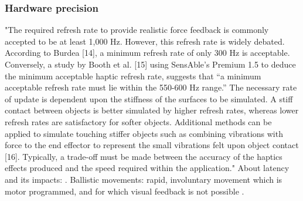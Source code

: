 \subsubsection{Hardware precision}
"The required refresh rate to provide realistic
force feedback is commonly accepted to be at least 1,000 Hz.
However, this refresh rate is widely debated. According to
Burdea [14], a minimum refresh rate of only 300 Hz is
acceptable. Conversely, a study by Booth et al. [15] using
SensAble’s Premium 1.5 to deduce the minimum acceptable
haptic refresh rate, suggests that “a minimum acceptable
refresh rate must lie within the 550-600 Hz range.” The
necessary rate of update is dependent upon the stiffness of
the surfaces to be simulated. A stiff contact between objects is
better simulated by higher refresh rates, whereas lower
refresh rates are satisfactory for softer objects. Additional
methods can be applied to simulate touching stiffer objects
such as combining vibrations with force to the end effector to
represent the small vibrations felt upon object contact [16].
Typically, a trade-off must be made between the accuracy of
the haptics effects produced and the speed required within
the application." \cite{Coles2011TheArt}
About latency and its impacts: \cite{Gourishetti2018PassiveFeedback}.
Ballistic movements: rapid, involuntary movement which is motor programmed, and for which visual feedback is not possible \cite{Wall2000}.
